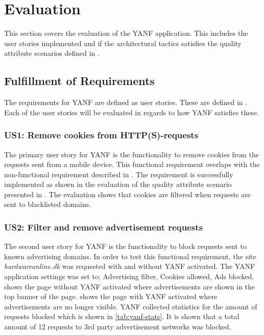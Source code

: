 \documentclass[main.tex]{subfiles}
\begin{document}
\section{Evaluation}
\label{sec:evaluation}
This section covers the evaluation of the YANF application. This includes the user stories implemented and if the architectural tactics satisfies the quality attribute scenarios defined in .

\subsection{Fulfillment of Requirements}
The requirements for YANF are defined as user stories. These are defined in . Each of the user stories will be evaluated in regards to how YANF satisfies these.

\subsubsection{US1: Remove cookies from HTTP(S)-requests}
The primary user story for YANF is the functionality to remove cookies from the requests sent from a mobile device. This functional requirement overlaps with the non-functional requirement described in . The requirement is successfully implemented as shown in the evaluation of the quality attribute scenario presented in . The evaluation shows that cookies are filtered when requests are sent to blacklisted domains. \\

\subsubsection{US2: Filter and remove advertisement requests}
The second user story for YANF is the functionality to block requests sent to known advertising domains. In order to test this functional requirement, the site \textit{hardwareonline.dk} was requested with and without YANF activated. The YANF application settings was set to; Advertising filter, Cookies allowed, Ads blocked.  shows the page without YANF activated where advertisements are shown in the top banner of the page.  shows the page with YANF activated where advertisements are no longer visible. YANF collected statistics for the amount of requests blocked which is shown in \autoref{tab:yanf-stats}. It is shown that a total amount of 12 requests to 3rd party advertisement networks was blocked.
\end{document}
